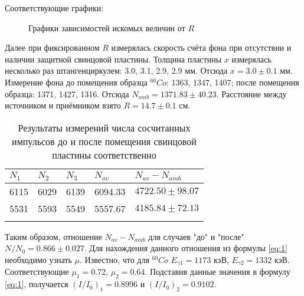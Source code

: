 \documentclass[12pt,a4paper]{article}
\begin{document}
	Соответствующие графики:
	\begin{figure}[H]
  		\centering
  		\caption{\label{fig:Sch}Графики зависимостей искомых величин от $R$}
	\end{figure}
	Далее при фиксированном $R$ измерялась скорость счёта фона при отсутствии и наличии защитной свинцовой пластины. Толщина пластины $x$ измерялась несколько раз штангенциркулем: 3.0, 3.1, 2.9, 2.9 мм. Отсюда $x = 3.0\pm0.1$ мм. Измерение фона до помещения образца ${}^{60}Co$: 1363, 1347, 1407; после помещения образца: 1371, 1427, 1316. Отсюда $N_{amb} = 1371.83\pm40.23$. Расстояние между источником и приёмником взято $R = 14.7\pm0.1$ см. 
	{\footnotesize
	\begin{longtable}{| l | l | l | l | l |}
		\hline
		$N_1$	&	$N_2$	&	$N_3$	&	$N_{av}$	&	$N_{av} - N_{amb}$	\\
		\hline
		6115	&	6029	&	6139	&	6094.33	&	$4722.50\pm98.07$	\\
		5531	&	5593	&	5549	&	5557.67	&	$4185.84\pm72.13$	\\
		\hline
	\caption{Результаты измерений числа сосчитанных импульсов до и после помещения свинцовой пластины соответственно} \label{tab:tab2}
	\end{longtable}}
	Таким образом, отношение $N_{av} - N_{amb}$ для случаев "до" и "после" $N/N_0 = 0.866\pm0.027$. Для нахождения данного отношения из формулы \ref{eq:1} необходимо узнать $\mu$. Известно, что для ${}^{60}Co$ $E_{\gamma1} = 1173$ кэВ,  $E_{\gamma2} = 1332$ кэВ. Соответствующие $\mu_1 = 0.72$, $\mu_2 = 0.64$. Подставив данные значения в формулу \ref{eq:1}, получается $(I/I_0)_1 = 0.8996$ и $(I/I_0)_2 = 0.9102$. 
\end{document}
